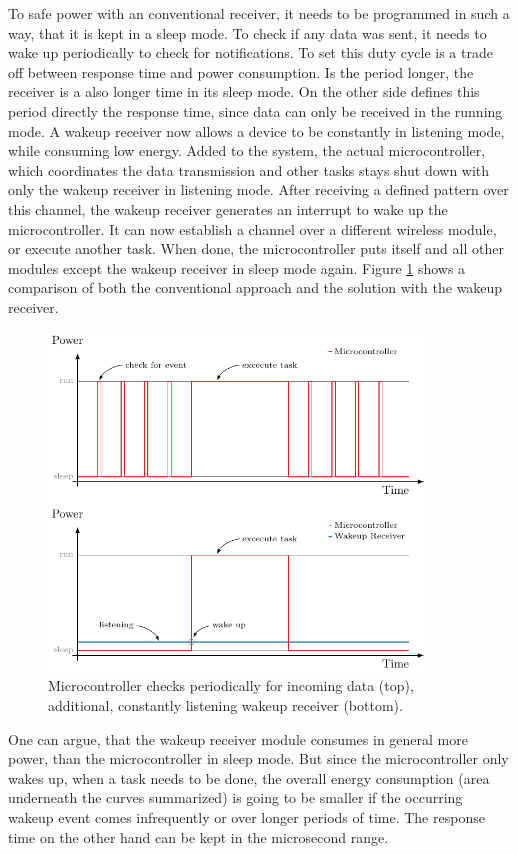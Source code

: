 To safe power with an conventional receiver, it needs to be programmed in such a way, that it is kept in a sleep mode.
To check if any data was sent, it needs to wake up periodically to check for notifications.
To set this duty cycle is a trade off between response time and power consumption.
Is the period longer, the receiver is a also longer time in its sleep mode.
On the other side defines this period directly the response time, since data can only be received in the running mode.
A wakeup receiver now allows a device to be constantly in listening mode, while consuming low energy.
Added to the system, the actual microcontroller, which coordinates the data transmission and other tasks stays shut down with only the wakeup receiver in listening mode.
After receiving a defined pattern over this channel, the wakeup receiver generates an interrupt to wake up the microcontroller. 
It can now establish a channel over a different wireless module, or execute another task.
When done, the microcontroller puts itself and all other modules except the wakeup receiver in sleep mode again.
Figure \ref{theory:wake} shows a comparison of both the conventional approach and the solution with the wakeup receiver. 
\begin{figure}[H]
	\centering
	\includegraphics[width=0.9\textwidth]{2-theory/wakeup/graphics/wake_comp.pdf}
	\caption{Microcontroller checks periodically for incoming data (top), additional, constantly listening  wakeup receiver (bottom).\label{theory:wake}}
\end{figure}
One can argue, that the wakeup receiver module consumes in general more power, than the microcontroller in sleep mode.
But since the microcontroller only wakes up, when a task needs to be done, the overall energy consumption (area underneath the curves summarized) is going to be smaller if the occurring wakeup event comes infrequently or over longer periods of time.
The response time on the other hand can be kept in the microsecond range.